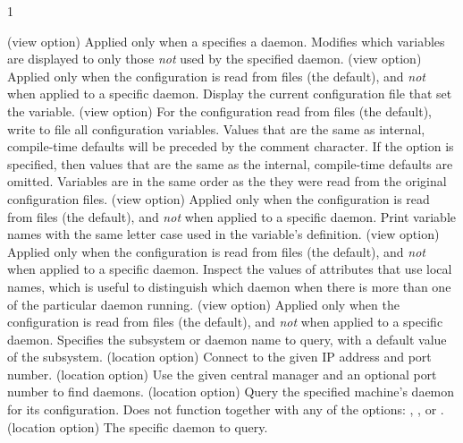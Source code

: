 \begin{ManPage}{\label{man-condor-config-val}}{1}
\begin{Options}
{   }
   {(view option)
    Applied only when a  specifies a daemon.
    Modifies which variables are displayed to only those \emph{not}
    used by the specified daemon.
   }
   {(view option)
    Applied only when the configuration is read from files (the default),
    and \emph{not} when applied to a specific daemon.
    Display the current configuration file that set the variable.
   }
   {(view option)
    For the configuration read from files (the default),
    write to file  all configuration variables. Values that are
    the same as internal, compile-time defaults will be preceded by the comment character.
    If the  option is specified, then values that are the same as
    the internal, compile-time defaults are omitted. Variables are in the same
    order as the they were read from the original configuration files.
   }
   {(view option)
    Applied only when the configuration is read from files (the default),
    and \emph{not} when applied to a specific daemon.
    Print variable names with the same letter case used in the 
    variable's definition.
   }
   {(view option) 
    Applied only when the configuration is read from files (the default),
    and \emph{not} when applied to a specific daemon.
    Inspect the values of attributes that use local names,
    which is useful to distinguish which daemon when there is more than
    one of the particular daemon running.}
   {(view option) 
    Applied only when the configuration is read from files (the default),
    and \emph{not} when applied to a specific daemon.
    Specifies the subsystem or daemon name to query, 
    with a default value of the  subsystem.
   }
   {(location option)
    Connect to the given IP address and port number. }
    {(location option) Use the given central manager and an optional 
    port number to find daemons. }
   { (location option)
    Query the specified
    machine's  daemon for its configuration. 
    Does not function together with any of the options:
    , , or . }
    {(location option) The specific daemon to query. }

\end{Options}
\end{ManPage}
